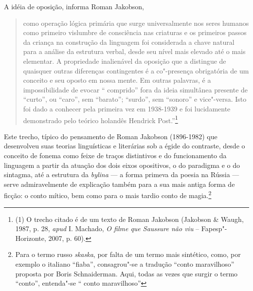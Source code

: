 A idéia de oposição, informa Roman Jakobson,

\begin{quote}
como operação lógica primária que surge
universalmente nos seres humanos como primeiro vislumbre de consciência
nas criaturas e os primeiros passos da criança na construção da
linguagem foi considerada a chave natural para a análise da estrutura
verbal, desde seu nível mais elevado até o mais elementar. A propriedade
inalienável da oposição que a distingue de quaisquer outras diferenças
contingentes é a co"-presença obrigatória de um conceito e seu oposto em
nossa mente. Em outras palavras, é a impossibilidade de evocar ``
comprido'' fora da ideia simultânea presente de ``curto'', ou ``caro'',
sem ``barato''; ``surdo'', sem ``sonoro'' e vice"-versa. Isto foi dado
a conhecer pela primeira vez em 1938-1939 e foi lucidamente demonstrado
pelo teórico holandês Hendrick Post.''\footnote{(1) O trecho citado é
  de um texto de Roman Jakobson (Jakobson \& Waugh, 1987, p.
  28, \emph{apud} I. Machado, \emph{O filme que Saussure não viu} -- Fapesp"-Horizonte, 2007, p. 60).}
\end{quote}



Este trecho, típico do pensamento de Roman Jakobson (1896-1982) que
desenvolveu suas teorias linguísticas e literárias sob a égide do
contraste, desde o conceito de fonema como feixe de traços distintivos e
do funcionamento da linguagem a partir da atuação dos dois eixos
opositivos, o do paradigma e o do sintagma, até a estrutura
da \emph{bylina} --- a forma primeva da poesia na Rússia --- serve
admiravelmente de explicação também para a sua mais antiga forma de
ficção: o conto mítico, bem como para o mais tardio conto de
magia.\footnote{Para o termo russo \emph{skaska}, por falta de um termo
  mais sintético, como, por exemplo o italiano ``fiaba'', consagrou"-se
  a tradução ``conto maravilhoso'' proposta por Boris Schnaiderman. Aqui, todas as vezes que surgir o termo ``conto'', entenda"-se ``
  conto maravilhoso''}


